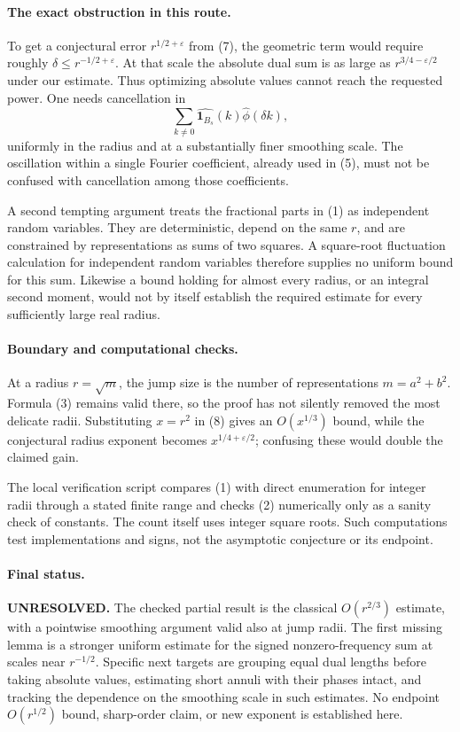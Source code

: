 \documentclass[11pt]{article}
\begin{document}
\paragraph{The exact obstruction in this route.}
To get a conjectural error $r^{1/2+\varepsilon}$ from (7), the geometric
term would require roughly $\delta\le r^{-1/2+\varepsilon}$.
At that scale the absolute dual sum is as large as
$r^{3/4-\varepsilon/2}$ under our estimate. Thus optimizing absolute
values cannot reach the requested power. One needs cancellation in
\[
 \sum_{k\ne0}\widehat{{\boldsymbol1}_{B_s}}(k)
                                     \widehat\phi(\delta k),
\]
uniformly in the radius and at a substantially finer smoothing scale.
The oscillation within a single Fourier coefficient, already used in
(5), must not be confused with cancellation among those coefficients.

A second tempting argument treats the fractional parts in (1) as
independent random variables. They are deterministic, depend on the
same $r$, and are constrained by representations as sums of two squares.
A square-root fluctuation calculation for independent random variables
therefore supplies no uniform bound for this sum. Likewise a bound
holding for almost every radius, or an integral second moment, would
not by itself establish the required estimate for every sufficiently
large real radius.

\paragraph{Boundary and computational checks.}
At a radius $r=\sqrt m$, the jump size is the number of representations
$m=a^2+b^2$. Formula (3) remains valid there, so the proof has not silently
removed the most delicate radii. Substituting $x=r^2$ in (8) gives an
$O(x^{1/3})$ bound, while the conjectural radius exponent becomes
$x^{1/4+\varepsilon/2}$; confusing these would double the claimed gain.

The local verification script compares (1) with direct enumeration for
integer radii through a stated finite range and checks (2) numerically
only as a sanity check of constants. The count itself uses integer
square roots. Such computations test implementations and signs, not
the asymptotic conjecture or its endpoint.

\paragraph{Final status.}
\textbf{UNRESOLVED.} The checked partial result is the classical
$O(r^{2/3})$ estimate, with a pointwise smoothing argument valid also
at jump radii. The first missing lemma is a stronger uniform estimate
for the signed nonzero-frequency sum at scales near $r^{-1/2}$.
Specific next targets are grouping equal dual lengths before taking
absolute values, estimating short annuli with their phases intact,
and tracking the dependence on the smoothing scale in such estimates.
No endpoint $O(r^{1/2})$ bound, sharp-order claim, or new exponent is
established here.
\end{document}
